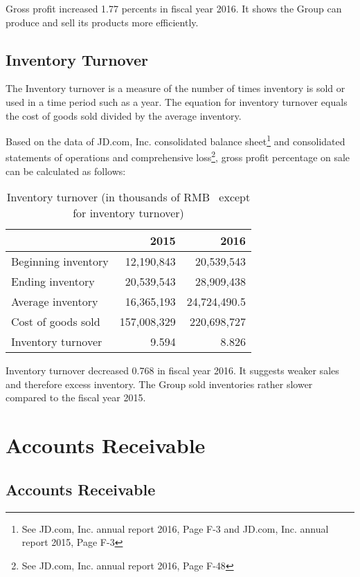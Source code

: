 Gross profit increased 1.77 percents in fiscal year 2016. It shows the Group can produce and sell its products more efficiently. 


\subsection{Inventory Turnover}

The Inventory turnover is a measure of the number of times inventory is sold or used in a time period such as a year. The equation for inventory turnover equals the cost of goods sold divided by the average inventory.

Based on the data of JD.com, Inc. consolidated balance sheet\footnote{See JD.com, Inc. annual report 2016, Page F-3 and JD.com, Inc. annual report 2015, Page F-3} and consolidated statements of operations and comprehensive loss\footnote{See JD.com, Inc. annual report 2016, Page F-48}, gross profit percentage on sale can be calculated as follows:

\begin{table}[H]	
	\begin{center}
		\begin{tabular}{lrr}
			\toprule
			&\textbf{2015}&\textbf{2016}\\
			\midrule
			Beginning inventory &12,190,843&20,539,543\\
			Ending inventory  &20,539,543&28,909,438\\
			Average inventory &16,365,193&24,724,490.5\\
			Cost of goods sold &157,008,329&220,698,727\\
			Inventory turnover &9.594&8.826\\
			\bottomrule
		\end{tabular}
	\end{center}
	\caption{Inventory turnover (in thousands of RMB \textyen\ except for inventory turnover)}\label{table:1}
\end{table}


Inventory turnover decreased 0.768 in fiscal year 2016. It suggests weaker sales and therefore excess inventory. The Group sold inventories rather slower compared to the fiscal year 2015. 

\section{Accounts Receivable}
\subsection{Accounts Receivable}

